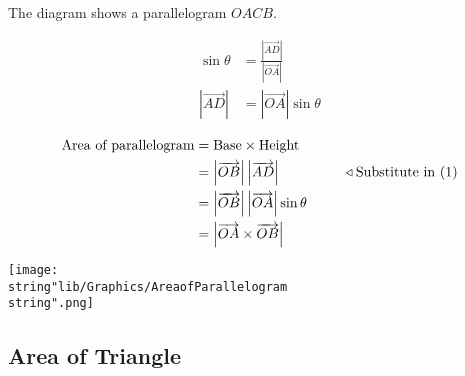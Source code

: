 \documentclass[11pt,a4paper]{book}
\begin{document}
\begin{minipage}[t]{0.65\textwidth}

The diagram shows a parallelogram $OACB$.

\begin{align*}
\sin\theta & =\frac{\left|\overrightarrow{AD}\right|}{\left|\overrightarrow{OA}\right|}\\
\left|\overrightarrow{AD}\right| & =\left|\overrightarrow{OA}\right|\sin\theta\tag{1}
\end{align*}

\begin{align*}
\text{Area of parallelogram} & =\text{Base}\times\text{Height}\\
 & =\left|\overrightarrow{OB}\right|\left|\overrightarrow{AD}\right|\hspace{1.6cm}\triangleleft\text{Substitute in \ensuremath{\left(1\right)}}\\
 & =\left|\overrightarrow{OB}\right|\left|\overrightarrow{OA}\right|\sin\theta\\
 & =\left|\overrightarrow{OA}\times\overrightarrow{OB}\right|
\end{align*}

\end{minipage}
\begin{minipage}[t]{0.2\textwidth}
\begin{center}
\texttt{[image: \\string"lib/Graphics/AreaofParallelogram\\string".png]}
\par\end{center}

\end{minipage}

\subsection{Area of Triangle}
\end{document}
